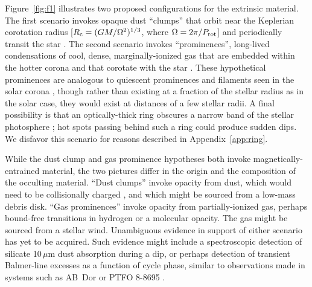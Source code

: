 \documentclass[11pt,twocolumn,tighten,linenumbers]{aastex63}
\begin{document}
Figure~\ref{fig:f1} illustrates two proposed configurations for the extrinsic
material.  The first scenario invokes opaque dust ``clumps'' that
orbit near the Keplerian corotation radius [$R_{\rm c} =
(GM/\Omega^2)^{1/3}$, where $\Omega = 2\pi/P_{\rm rot}$] and
periodically transit the star
\citep[e.g.][]{2017AJ....153..152S,2017MNRAS.471L.145F,2023MNRAS.518.4734S}.
The second scenario invokes ``prominences'', long-lived condensations
of cool, dense, marginally-ionized gas that are embedded within the
hotter corona and that corotate with the star
\citep{1989MNRAS.238..657C,2019MNRAS.482.2853J,2022MNRAS.514.5465W}.
These hypothetical prominences are analogous to quiescent prominences
and filaments seen in the solar corona \citep[see
e.g.][]{2015ASSL..415.....V}, though rather than existing at a
fraction of the stellar radius as in the solar case, they would exist
at distances of a few stellar radii.  A final possibility is that an
optically-thick ring obscures a narrow band of the stellar photosphere
\citep{2019ApJ...876..127Z}; hot spots passing behind such a ring
could produce sudden dips.  We disfavor this scenario for reasons
described in Appendix~\ref{app:ring}.

While the dust clump and gas prominence hypotheses both invoke
magnetically-entrained material, the two pictures differ in the origin
and the composition of the occulting material.   ``Dust clumps''
invoke opacity from dust, which would need to be collisionally charged
\citep{2023MNRAS.518.4734S}, and which might be sourced from a
low-mass debris disk.  ``Gas prominences'' invoke opacity from
partially-ionized gas, perhaps bound-free transitions in hydrogen or a
molecular opacity.  The gas might be sourced from a stellar wind.
Unambiguous evidence in support of either scenario has yet to be
acquired.  Such evidence might include a spectroscopic detection of
silicate 10\,$\mu$m dust absorption during a dip, or perhaps detection
of transient Balmer-line excesses as a function of cycle phase,
similar to observations made in systems such as AB~Dor
\citep[see][]{1999ASPC..158..146C} or PTFO 8-8695
\citep{2016ApJ...830...15J}.
\end{document}

